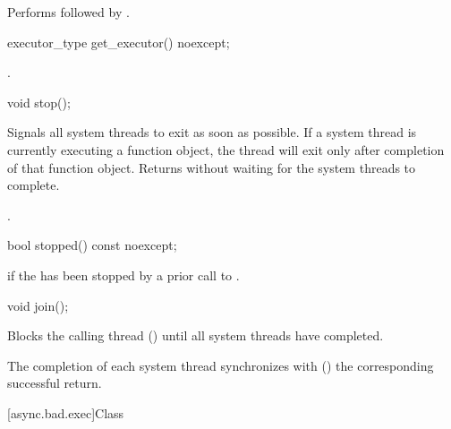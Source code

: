 \begin{itemdescr}
\pnum
\effects Performs  followed by .
\end{itemdescr}

%
\begin{itemdecl}
executor_type get_executor() noexcept;
\end{itemdecl}

\begin{itemdescr}
\pnum
\returns {}.
\end{itemdescr}

%
\begin{itemdecl}
void stop();
\end{itemdecl}

\begin{itemdescr}
\pnum
\effects Signals all system threads to exit as soon as possible. If a system thread is currently executing a function object, the thread will exit only after completion of that function object. Returns without waiting for the system threads to complete.

\pnum
\postconditions {}.
\end{itemdescr}

%
\begin{itemdecl}
bool stopped() const noexcept;
\end{itemdecl}

\begin{itemdescr}
\pnum
\returns {} if the  has been stopped by a prior call to .
\end{itemdescr}

%
\begin{itemdecl}
void join();
\end{itemdecl}

\begin{itemdescr}
\pnum
\effects Blocks the calling thread () until all system threads have completed.

\pnum
\sync The completion of each system thread synchronizes with () the corresponding successful  return.
\end{itemdescr}



[async.bad.exec]{Class }

